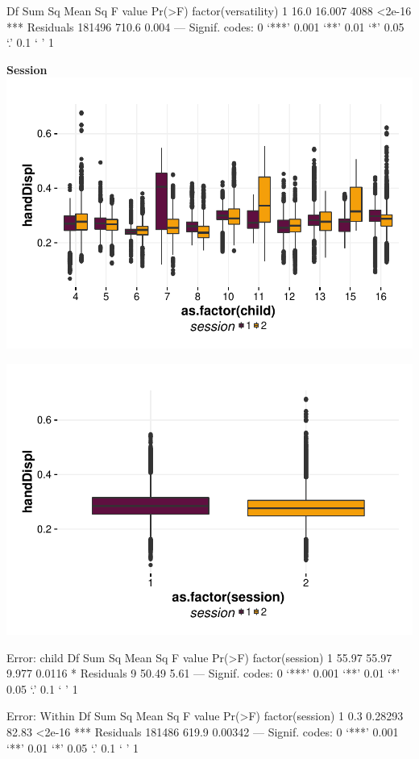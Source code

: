 \documentclass{article}
\begin{document}
\begin{Schunk}
\begin{Soutput}
                        Df Sum Sq Mean Sq F value Pr(>F)    
factor(versatility)      1   16.0  16.007    4088 <2e-16 ***
Residuals           181496  710.6   0.004                   
---
Signif. codes:  0 ‘***’ 0.001 ‘**’ 0.01 ‘*’ 0.05 ‘.’ 0.1 ‘ ’ 1
\end{Soutput}
\end{Schunk}

\textbf{Session}
\includegraphics{features-plot_handdisplacement_child_session_quiz}

\includegraphics{features-plot_handdisplacement_session_quiz}

\begin{Schunk}
\begin{Soutput}
Error: child
                Df Sum Sq Mean Sq F value Pr(>F)  
factor(session)  1  55.97   55.97   9.977 0.0116 *
Residuals        9  50.49    5.61                 
---
Signif. codes:  0 ‘***’ 0.001 ‘**’ 0.01 ‘*’ 0.05 ‘.’ 0.1 ‘ ’ 1

Error: Within
                    Df Sum Sq Mean Sq F value Pr(>F)    
factor(session)      1    0.3 0.28293   82.83 <2e-16 ***
Residuals       181486  619.9 0.00342                   
---
Signif. codes:  0 ‘***’ 0.001 ‘**’ 0.01 ‘*’ 0.05 ‘.’ 0.1 ‘ ’ 1
\end{Soutput}
\end{Schunk}
\end{document}
